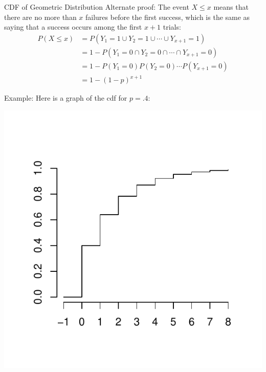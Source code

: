 \documentclass[xcolor=table]{beamer}
\begin{document}
\begin{frame}{CDF of Geometric Distribution}
Alternate proof: The event $X \leq x$ means that there are no more than $x$ failures before the first success, which is the same as saying that a success occurs among the first $x+1$ trials:
\pause 
\begin{align*}
P(X \leq x) &= P(Y_1=1 \cup Y_2=1 \cup \cdots \cup Y_{x+1}=1) \\
&= 1-P(Y_1=0 \cap Y_2=0 \cap \cdots \cap Y_{x+1}=0) \\
&= 1- P(Y_1=0)P(Y_2=0)\cdots P(Y_{x+1}=0) \\
&= 1- (1-p)^{x+1}
\end{align*}

\pause Example: Here is a graph of the cdf for $p=.4$:
\vspace{-0.7cm}
\begin{center}
\includegraphics[scale=.48]{ch3_cdf_geom.pdf}
\end{center}
\end{frame}
\end{document}
